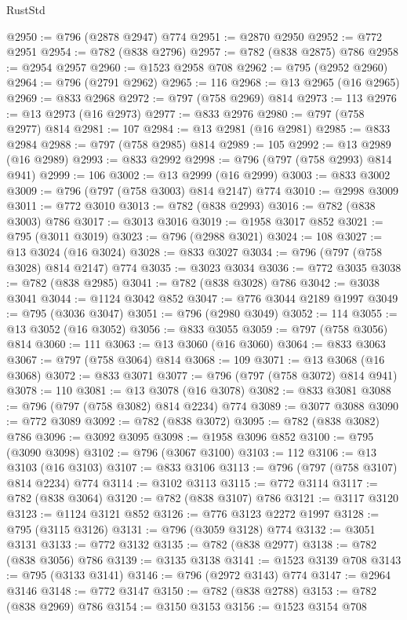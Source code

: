 \begin{lexlean}{RustStd}
\begin{coremodule}
@2950 := @796 (@2878 @2947) @774
@2951 := @2870 @2950
@2952 := @772 @2951
@2954 := @782 (@838 @2796)
@2957 := @782 (@838 @2875) @786
@2958 := @2954 @2957
@2960 := @1523 @2958 @708
@2962 := @795 (@2952 @2960)
@2964 := @796 (@2791 @2962)
@2965 := 116
@2968 := @13 @2965 (@16 @2965)
@2969 := @833 @2968
@2972 := @797 (@758 @2969) @814
@2973 := 113
@2976 := @13 @2973 (@16 @2973)
@2977 := @833 @2976
@2980 := @797 (@758 @2977) @814
@2981 := 107
@2984 := @13 @2981 (@16 @2981)
@2985 := @833 @2984
@2988 := @797 (@758 @2985) @814
@2989 := 105
@2992 := @13 @2989 (@16 @2989)
@2993 := @833 @2992
@2998 := @796 (@797 (@758 @2993) @814 @941)
@2999 := 106
@3002 := @13 @2999 (@16 @2999)
@3003 := @833 @3002
@3009 := @796 (@797 (@758 @3003) @814 @2147) @774
@3010 := @2998 @3009
@3011 := @772 @3010
@3013 := @782 (@838 @2993)
@3016 := @782 (@838 @3003) @786
@3017 := @3013 @3016
@3019 := @1958 @3017 @852
@3021 := @795 (@3011 @3019)
@3023 := @796 (@2988 @3021)
@3024 := 108
@3027 := @13 @3024 (@16 @3024)
@3028 := @833 @3027
@3034 := @796 (@797 (@758 @3028) @814 @2147) @774
@3035 := @3023 @3034
@3036 := @772 @3035
@3038 := @782 (@838 @2985)
@3041 := @782 (@838 @3028) @786
@3042 := @3038 @3041
@3044 := @1124 @3042 @852
@3047 := @776 @3044 @2189 @1997
@3049 := @795 (@3036 @3047)
@3051 := @796 (@2980 @3049)
@3052 := 114
@3055 := @13 @3052 (@16 @3052)
@3056 := @833 @3055
@3059 := @797 (@758 @3056) @814
@3060 := 111
@3063 := @13 @3060 (@16 @3060)
@3064 := @833 @3063
@3067 := @797 (@758 @3064) @814
@3068 := 109
@3071 := @13 @3068 (@16 @3068)
@3072 := @833 @3071
@3077 := @796 (@797 (@758 @3072) @814 @941)
@3078 := 110
@3081 := @13 @3078 (@16 @3078)
@3082 := @833 @3081
@3088 := @796 (@797 (@758 @3082) @814 @2234) @774
@3089 := @3077 @3088
@3090 := @772 @3089
@3092 := @782 (@838 @3072)
@3095 := @782 (@838 @3082) @786
@3096 := @3092 @3095
@3098 := @1958 @3096 @852
@3100 := @795 (@3090 @3098)
@3102 := @796 (@3067 @3100)
@3103 := 112
@3106 := @13 @3103 (@16 @3103)
@3107 := @833 @3106
@3113 := @796 (@797 (@758 @3107) @814 @2234) @774
@3114 := @3102 @3113
@3115 := @772 @3114
@3117 := @782 (@838 @3064)
@3120 := @782 (@838 @3107) @786
@3121 := @3117 @3120
@3123 := @1124 @3121 @852
@3126 := @776 @3123 @2272 @1997
@3128 := @795 (@3115 @3126)
@3131 := @796 (@3059 @3128) @774
@3132 := @3051 @3131
@3133 := @772 @3132
@3135 := @782 (@838 @2977)
@3138 := @782 (@838 @3056) @786
@3139 := @3135 @3138
@3141 := @1523 @3139 @708
@3143 := @795 (@3133 @3141)
@3146 := @796 (@2972 @3143) @774
@3147 := @2964 @3146
@3148 := @772 @3147
@3150 := @782 (@838 @2788)
@3153 := @782 (@838 @2969) @786
@3154 := @3150 @3153
@3156 := @1523 @3154 @708

\end{coremodule}
\end{lexlean}
